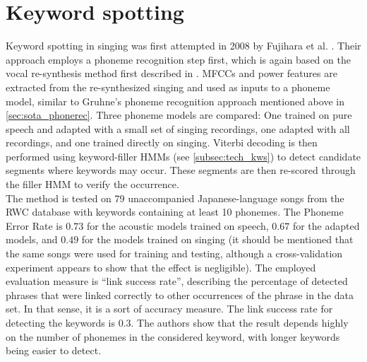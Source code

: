 \section{Keyword spotting}
Keyword spotting in singing was first attempted in 2008 by Fujihara et al. \cite{hyperlinking_lyrics}. Their approach employs a phoneme recognition step first, which is again based on the vocal re-synthesis method first described in \cite{fujihara_identification}. MFCCs and power features are extracted from the re-synthesized singing and used as inputs to a phoneme model, similar to Gruhne's phoneme recognition approach mentioned above in \ref{sec:sota_phonerec}.  Three phoneme models are compared: One trained on pure speech and adapted with a small set of singing recordings, one adapted with all recordings, and one trained directly on singing. Viterbi decoding is then performed using keyword-filler HMMs (see \ref{subsec:tech_kws}) to detect candidate segments where keywords may occur. These segments are then re-scored through the filler HMM to verify the occurrence.\\
The method is tested on 79 unaccompanied Japanese-language songs from the RWC database \cite{rwc} with keywords containing at least 10 phonemes. The Phoneme Error Rate is $0.73$ for the acoustic models trained on speech, $0.67$ for the adapted models, and $0.49$ for the models trained on singing (it should be mentioned that the same songs were used for training and testing, although a cross-validation experiment appears to show that the effect is negligible). The employed evaluation measure is ``link success rate'', describing the percentage of detected phrases that were linked correctly to other occurrences of the phrase in the data set. In that sense, it is a sort of accuracy measure. The link success rate for detecting the keywords is $0.3$. The authors show that the result depends highly on the number of phonemes in the considered keyword, with longer keywords being easier to detect.\\

